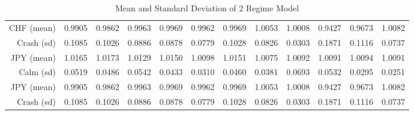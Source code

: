 \documentclass[12pt, a4paper, oneside]{article} %
\begin{document}
\begin{landscape}
\begin{table}[ht]
\begin{tabular}{rrrrrrrrrrrr}
  CHF (mean) & 0.9905 & 0.9862 & 0.9963 & 0.9969 & 0.9962 & 0.9969 & 1.0053 & 1.0008 & 0.9427 & 0.9673 & 1.0082 \\ 
  Crash (sd) & 0.1085 & 0.1026 & 0.0886 & 0.0878 & 0.0779 & 0.1028 & 0.0826 & 0.0303 & 0.1871 & 0.1116 & 0.0737 \\ 
  \hline
  JPY (mean) & 1.0165 & 1.0173 & 1.0129 & 1.0150 & 1.0098 & 1.0151 & 1.0075 & 1.0092 & 1.0091 & 1.0094 & 1.0091 \\ 
  Calm (sd) & 0.0519 & 0.0486 & 0.0542 & 0.0433 & 0.0310 & 0.0460 & 0.0381 & 0.0693 & 0.0532 & 0.0295 & 0.0251 \\ 
  JPY (mean) & 0.9905 & 0.9862 & 0.9963 & 0.9969 & 0.9962 & 0.9969 & 1.0053 & 1.0008 & 0.9427 & 0.9673 & 1.0082 \\ 
  Crash (sd) & 0.1085 & 0.1026 & 0.0886 & 0.0878 & 0.0779 & 0.1028 & 0.0826 & 0.0303 & 0.1871 & 0.1116 & 0.0737 \\ 
   \hline
\end{tabular}
\caption{Mean and Standard Deviation of 2 Regime Model}
\label{tabref:2StateProb}
\end{table}
\end{landscape}
\end{document}
